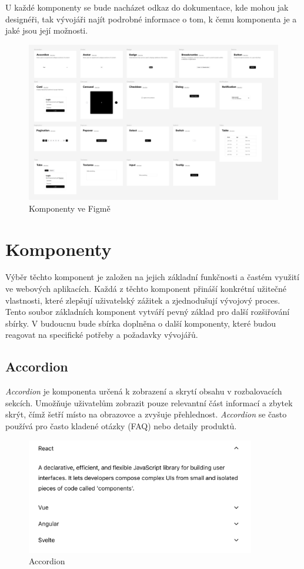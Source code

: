 U každé komponenty se bude nacházet odkaz do dokumentace, kde mohou jak designéři, tak vývojáři najít podrobné informace o tom, k čemu komponenta je a jaké jsou její možnosti.

\begin{figure}[H]
  \includegraphics[width=\textwidth]{images/figma-kit}
  \caption{Komponenty ve Figmě} \label{picture:figma-kit}
\end{figure}

\clearpage

\section{Komponenty}
Výběr těchto komponent je založen na jejich základní funkčnosti a častém využití ve webových aplikacích. Každá z těchto komponent přináší konkrétní užitečné vlastnosti, které zlepšují uživatelský zážitek a zjednodušují vývojový proces. Tento soubor základních komponent vytváří pevný základ pro další rozšiřování sbírky. V budoucnu bude sbírka doplněna o další komponenty, které budou reagovat na specifické potřeby a požadavky vývojářů.

\subsection{Accordion}
\emph{Accordion} je komponenta určená k zobrazení a skrytí obsahu v rozbalovacích sekcích. Umožňuje uživatelům zobrazit pouze relevantní část informací a zbytek skrýt, čímž šetří místo na obrazovce a zvyšuje přehlednost. \emph{Accordion} se často používá pro často kladené otázky (FAQ) nebo detaily produktů.

\begin{figure}[H]
  \centering
  \includegraphics[width=10cm]{images/accordion}
  \captionsetup{justification=centering,margin=2cm}
  \caption{Accordion} \label{picture:accordion}
\end{figure}

